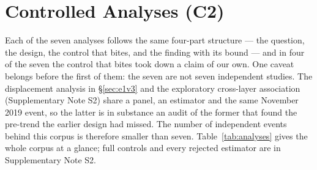 \section{Controlled Analyses (C2)}

Each of the seven analyses follows the same four-part structure --- the
question, the design, the control that bites, and the finding with its bound ---
and in four of the seven the control that bites took down a claim of our own.
One caveat belongs before the first of them: the seven are not seven independent
studies. The displacement analysis in \S\ref{sec:e1v3} and the exploratory
cross-layer association (Supplementary Note S2) share a panel, an estimator and
the same November 2019 event, so the latter is in substance an audit of the
former that found the pre-trend the earlier design had missed. The number of
independent events behind this corpus is therefore smaller than seven.
Table~\ref{tab:analyses} gives the whole corpus at a glance; full controls and
every rejected estimator are in Supplementary Note S2.

